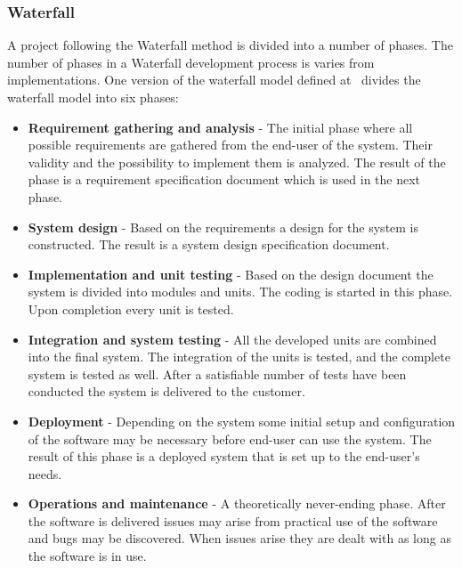 \subsubsection{Waterfall}
A project following the Waterfall method is divided into a number of phases.
The number of phases in a Waterfall development process is varies from implementations.
One version of the waterfall model defined at~\citep{Parekh11} divides the waterfall model into six phases:

\begin{itemize}
	\item \textbf{Requirement gathering and analysis} - The initial phase where all possible requirements are gathered from the end-user of the system.
	Their validity and the possibility to implement them is analyzed.
	The result of the phase is a requirement specification document which is used in the next phase.
	\item \textbf{System design} - Based on the requirements a design for the system is constructed. 
	The result is a system design specification document.
	\item \textbf{Implementation and unit testing} - Based on the design document the system is divided into modules and units. 
	The coding is started in this phase. 
	Upon completion every unit is tested.
	\item \textbf{Integration and system testing} - All the developed units are combined into the final system. 
	The integration of the units is tested, and the complete system is tested as well. 
	After a satisfiable number of tests have been conducted the system is delivered to the customer.
	\item \textbf{Deployment} - Depending on the system some initial setup and configuration of the software may be necessary before end-user can use the system. 
	The result of this phase is a deployed system that is set up to the end-user's needs.
	\item \textbf{Operations and maintenance} - A theoretically never-ending phase. 
	After the software is delivered issues may arise from practical use of the software and bugs may be discovered. 
	When issues arise they are dealt with as long as the software is in use.
\end{itemize}

